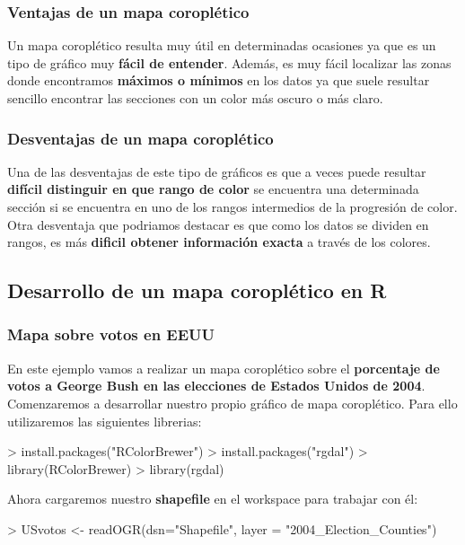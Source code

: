\documentclass [a4paper] {article}
\begin{document}
\subsubsection{Ventajas de un mapa coroplético}

Un mapa coroplético resulta muy útil en determinadas ocasiones ya que es un tipo de gráfico muy \textbf{fácil de entender}.
Además, es muy fácil localizar las zonas donde encontramos \textbf{máximos o mínimos} en los datos ya que suele resultar sencillo
encontrar las secciones con un color más oscuro o más claro.

\subsubsection{Desventajas de un mapa coroplético}

Una de las desventajas de este tipo de gráficos es que a veces puede resultar \textbf{difícil distinguir en que rango de color}
se encuentra una determinada sección si se encuentra en uno de los rangos intermedios de la progresión de color.
Otra desventaja que podriamos destacar es que como los datos se dividen en rangos, es más \textbf{dificil obtener información
exacta} a través de los colores.

\subsection{Desarrollo de un mapa coroplético en R}

\subsubsection{Mapa sobre votos en EEUU}
En este ejemplo vamos a realizar un mapa coroplético sobre el \textbf{porcentaje de votos a George Bush en las elecciones de Estados
Unidos de 2004}.
Comenzaremos a desarrollar nuestro propio gráfico de mapa coroplético. Para ello utilizaremos
las siguientes librerias:

\begin{Schunk}
\begin{Sinput}
> install.packages("RColorBrewer")
> install.packages("rgdal")
> library(RColorBrewer)
> library(rgdal)
\end{Sinput}
\end{Schunk}

Ahora cargaremos nuestro \textbf{shapefile} en el workspace para trabajar con él:

\begin{Schunk}
\begin{Sinput}
> USvotos <- readOGR(dsn="Shapefile", layer = "2004_Election_Counties")
\end{Sinput}
\end{Schunk}
\end{document}
